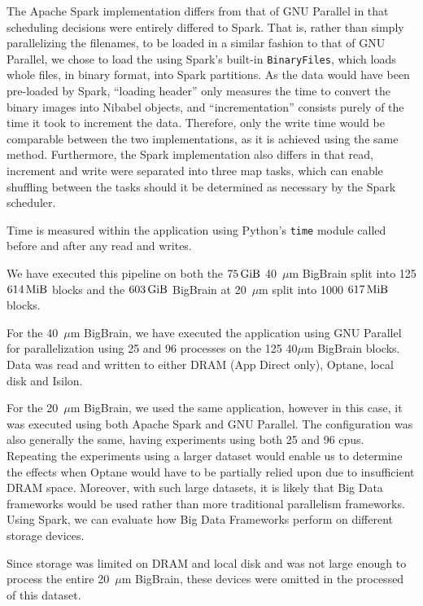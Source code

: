 \documentclass[conference]{IEEEtran}
\newcommand{\bigbrain}{BigBrain\xspace}
\begin{document}
The Apache Spark implementation differs from that of GNU Parallel in that scheduling decisions
were entirely differed to Spark. That is, rather than simply parallelizing the filenames, to be
loaded in a similar fashion to that of GNU Parallel, we chose to load the using Spark's built-in
\texttt{BinaryFiles}, which loads whole files, in binary format, into Spark partitions. As the
data would have been pre-loaded by Spark, ``loading header'' only measures the time to
convert the binary images into Nibabel objects, and ``incrementation'' consists purely
of the time it took to increment the data. Therefore, only the write time would be
comparable between the two implementations, as it is achieved using the same method.
Furthermore, the Spark implementation also differs in that read, increment and write
were separated into three map tasks, which can enable shuffling between the tasks should 
it be determined as necessary by the Spark scheduler.

Time is measured within the application using Python's \texttt{time} module 
called before and after any read and writes.

We have executed this pipeline on both the $\SI{75}{\gibi\byte}$ 40~$\mu$m 
\bigbrain split into 125 $\SI{614}{\mebi\byte}$ blocks and the $\SI{603}{\gibi\byte}$
\bigbrain at 20~$\mu$m split into 1000 $\SI{617}{\mebi\byte}$ blocks.

For the 40~$\mu$m \bigbrain, we have executed the application using GNU Parallel for parallelization
using 25 and 96 processes on the 125 40$\mu$m \bigbrain blocks. Data was read and written to either
DRAM (App Direct only), Optane, local disk and Isilon. 

For the 20~$\mu$m \bigbrain, we used the same application, however in this case, it was executed
using both Apache Spark and GNU Parallel. The configuration was also generally the same, having 
experiments using both 25 and 96 cpus. Repeating the experiments using a larger dataset would enable
us to determine the effects when Optane would have to be partially relied upon due to insufficient DRAM
space. Moreover, with such large datasets, it is likely that Big Data frameworks would be used rather than
more traditional parallelism frameworks. Using Spark, we can evaluate how Big Data Frameworks perform on
different storage devices.

Since storage was limited on DRAM and local disk and was not large enough to process the entire
20~$\mu$m \bigbrain, these devices were omitted in the processed of this dataset. 
\end{document}
